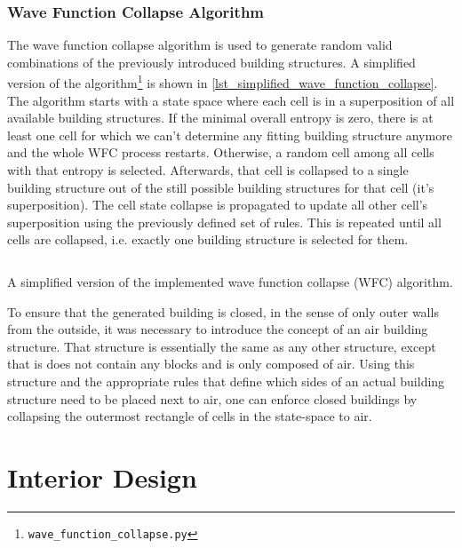 \documentclass[
oneside,
fontsize=11pt
]{scrartcl}
\begin{document}
\subsubsection{Wave Function Collapse Algorithm}
The wave function collapse algorithm \cite{WFC_GitHub} 
is used to generate random valid combinations of the previously introduced building structures.
A simplified version of the algorithm\footnote{\texttt{wave\_function\_collapse.py}} 
is shown in \autoref{lst_simplified_wave_function_collapse}.
The algorithm starts with a state space where each cell is in a superposition of all available building structures.
If the minimal overall entropy is zero, there is at least one cell for which we can't determine 
any fitting building structure anymore and the whole WFC process restarts. 
Otherwise, a random cell among all cells with that entropy is selected. 
Afterwards, that cell is collapsed to a single building structure out of the still 
possible building structures for that cell (it's superposition).
The cell state collapse is propagated to update all other cell's superposition
using the previously defined set of rules. 
This is repeated until all cells are collapsed, i.e. 
exactly one building structure is selected for them.

\begin{listing}[ht]
  \inputminted[baselinestretch=0.55,linenos,breaklines]{python}{listings/wave_function_collapse_simplified.py}
  \caption{A simplified version of the implemented wave function collapse (WFC) algorithm.}    
  \label{lst_simplified_wave_function_collapse}
\end{listing}

To ensure that the generated building is closed, 
in the sense of only outer walls from the outside, 
it was necessary to introduce the concept of an air building structure. 
That structure is essentially the same as any other structure, 
except that is does not contain any blocks and is only composed of air. 
Using this structure and the appropriate rules that define which sides 
of an actual building structure need to be placed next to air, 
one can enforce closed buildings by collapsing the outermost rectangle 
of cells in the state-space to air.

\section{Interior Design}
\end{document}
